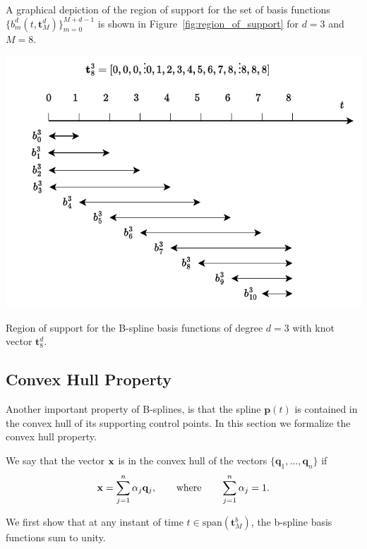 A graphical depiction of the region of support for the set of basis functions $\{b_m^d(t, \mathbf{t}_M^d)\}_{m=0}^{M+d-1}$ is shown in Figure~\ref{fig:region_of_support} for $d=3$ and $M=8$.
\begin{marginfigure}[0in]
  \includegraphics[width=\linewidth]{./chap5_trajectory_planning/figures/region_of_support.drawio.pdf}
  \caption{Region of support for the B-spline basis functions of degree $d=3$ with knot vector $\mathbf{t}_8^d$.}
  \label{fig:region_of_support}  
\end{marginfigure}

\subsection{Convex Hull Property}

Another important property of B-splines, is that the spline $\mathbf{p}(t)$ is contained in the convex hull of its supporting control points.  In this section we formalize the convex hull property.

\begin{definition}
We say that the vector $\mathbf{x}$ is in the convex hull of the vectors $\{\mathbf{q}_1, \dots, \mathbf{q}_n\}$ if 
\[
\mathbf{x} = \sum_{j=1}^n \alpha_j \mathbf{q}_j, \qquad \text{where} \qquad \sum_{j=1}^n \alpha_j = 1.
\]	
\end{definition}

We first show that at any instant of time $t\in\text{span}(\mathbf{t}_M^b)$, the b-spline basis functions sum to unity.   

